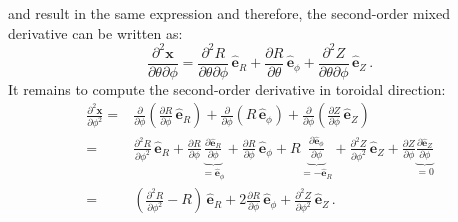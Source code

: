  and  result in the same expression and therefore,
the second-order mixed derivative can be written as:
\begin{equation}
      \frac{\partial^2 \mathbf{x}}{\partial \theta \partial \phi}
  =   \frac{\partial^2         R }{\partial \theta \partial \phi} \, \hat{\mathbf{e}}_R
    + \frac{\partial           R }{\partial \theta              } \, \hat{\mathbf{e}}_\phi
    + \frac{\partial^2         Z }{\partial \theta \partial \phi} \, \hat{\mathbf{e}}_Z  \label{eqn:d2Xdtz} \, .
\end{equation}
It remains to compute the second-order derivative in toroidal direction:
\begin{align}
      \frac{\partial^2 \mathbf{x}}{\partial \phi^2}
 =&   \frac{\partial}{\partial \phi} \left( \frac{\partial R}{\partial \phi} \, \hat{\mathbf{e}}_R    \right)
    + \frac{\partial}{\partial \phi} \left(                R                 \, \hat{\mathbf{e}}_\phi \right)
    + \frac{\partial}{\partial \phi} \left( \frac{\partial Z}{\partial \phi} \, \hat{\mathbf{e}}_Z    \right) \nonumber \\
 =&   \frac{\partial^2 R }{\partial \phi^2} \, \hat{\mathbf{e}}_R
    + \frac{\partial   R }{\partial \phi  } \underbrace{\frac{\partial \hat{\mathbf{e}}_R}{\partial \phi}}_{=\hat{\mathbf{e}}_\phi}
    + \frac{\partial   R }{\partial \phi  } \,\hat{\mathbf{e}}_\phi
    +                  R                    \underbrace{\frac{\partial \hat{\mathbf{e}}_\phi}{\partial \phi}}_{=-\hat{\mathbf{e}}_R}
    + \frac{\partial^2 Z }{\partial \phi^2} \, \hat{\mathbf{e}}_Z
    + \frac{\partial   Z }{\partial \phi  } \underbrace{\frac{\partial \hat{\mathbf{e}}_Z}{\partial \phi}}_{=0} \nonumber \\
 =&   \left( \frac{\partial^2 R}{\partial \phi^2} - R \right) \, \hat{\mathbf{e}}_R
    +   2    \frac{\partial   R}{\partial \phi  }             \, \hat{\mathbf{e}}_\phi
    + \frac{\partial^2 Z }{\partial \phi^2} \, \hat{\mathbf{e}}_Z \label{eqn:d2Xdz2} \, .
\end{align}

\FloatBarrier
